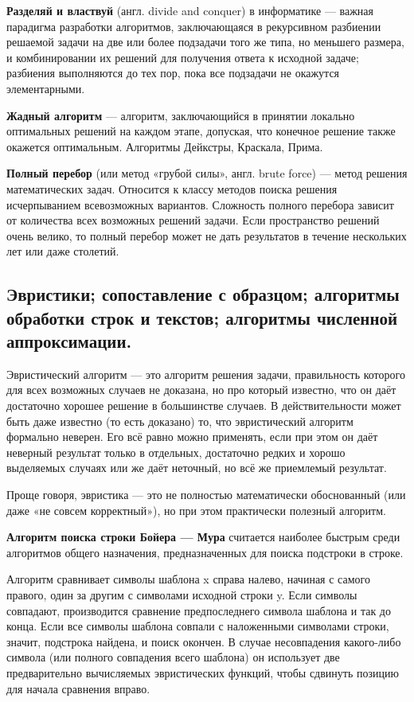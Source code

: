 \documentclass[12pt, a4paper]{article}
\begin{document}
\textbf{Разделяй и властвуй} (англ. divide and conquer) в информатике — важная парадигма разработки алгоритмов, заключающаяся в рекурсивном разбиении решаемой задачи на две или более подзадачи того же типа, но меньшего размера, и комбинировании их решений для получения ответа к исходной задаче; разбиения выполняются до тех пор, пока все подзадачи не окажутся элементарными.

\textbf{Жадный алгоритм} — алгоритм, заключающийся в принятии локально оптимальных решений на каждом этапе, допуская, что конечное решение также окажется оптимальным. Алгоритмы Дейкстры, Краскала, Прима.

\textbf{Полный перебор} (или метод «грубой силы», англ. brute force) — метод решения математических задач. Относится к классу методов поиска решения исчерпыванием всевозможных вариантов. Сложность полного перебора зависит от количества всех возможных решений задачи. Если пространство решений очень велико, то полный перебор может не дать результатов в течение нескольких лет или даже столетий.

\subsection{Эвристики; сопоставление с образцом; алгоритмы обработки строк и текстов; алгоритмы численной аппроксимации.}

Эвристический алгоритм — это алгоритм решения задачи, правильность которого для всех возможных случаев не доказана, но про который известно, что он даёт достаточно хорошее решение в большинстве случаев. В действительности может быть даже известно (то есть доказано) то, что эвристический алгоритм формально неверен. Его всё равно можно применять, если при этом он даёт неверный результат только в отдельных, достаточно редких и хорошо выделяемых случаях или же даёт неточный, но всё же приемлемый результат.

Проще говоря, эвристика — это не полностью математически обоснованный (или даже «не совсем корректный»), но при этом практически полезный алгоритм.

\textbf{Алгоритм поиска строки Бойера — Мура} считается наиболее быстрым среди алгоритмов общего назначения, предназначенных для поиска подстроки в строке.

Алгоритм сравнивает символы шаблона x справа налево, начиная с самого правого, один за другим с символами исходной строки y. Если символы совпадают, производится сравнение предпоследнего символа шаблона и так до конца. Если все символы шаблона совпали с наложенными символами строки, значит, подстрока найдена, и поиск окончен. В случае несовпадения какого-либо символа (или полного совпадения всего шаблона) он использует две предварительно вычисляемых эвристических функций, чтобы сдвинуть позицию для начала сравнения вправо.
\end{document}
